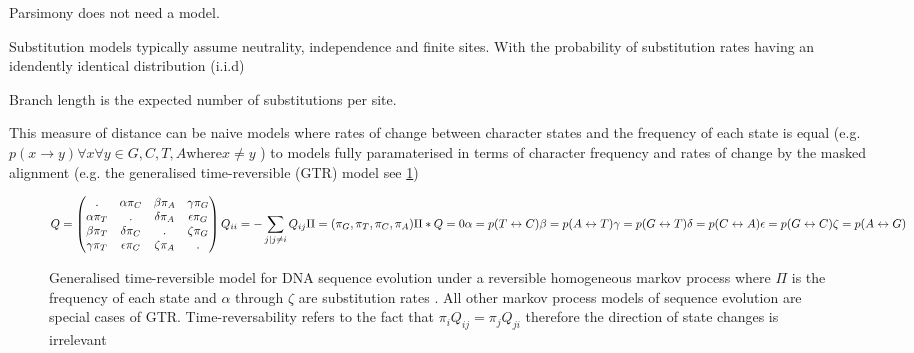 Parsimony does not need a model.




Substitution models typically assume neutrality, independence and finite sites.
With the probability of substitution rates having an idendently identical distribution (i.i.d) \citep{Hasegawa1985}




Branch length is the expected number of substitutions per site.

This measure of distance can be naive models where rates of change between character
states and the frequency of each state is equal (e.g. \(p(x \rightarrow y) \forall x \forall y \in {G,C,T,A} \text{where} x\neq y\)
\citep{jukes1969evolution}) to models fully paramaterised in terms of character frequency and rates of change by the masked alignment 
(e.g. the generalised time-reversible (GTR) model \citep{Tavare1986} see \ref{eq:gtr})

\begin{figure}
    \[Q=\begin{pmatrix}
        . & \alpha\pi_{C}  & \beta\pi_{A} & \gamma\pi_{G}\\ 
        \alpha\pi_{T} & . & \delta\pi_{A} & \epsilon\pi_{G}\\ 
        \beta\pi_{T} & \delta\pi_{C} & . & \zeta\pi_{G}\\ 
        \gamma\pi_{T} & \epsilon\pi_{C} & \zeta\pi_{A} & .
    \end{pmatrix}\\
    Q_{ii} = -\sum_{{j | j \neq i}} Q_{ij}\\
    \Pi = (\pi_{G}, \pi_{T}, \pi_{C}, \pi_{A})\\
    \Pi * Q = 0 \\
    \alpha = p(T \leftrightarrow C)\\
    \beta = p(A \leftrightarrow T)\\
    \gamma = p(G \leftrightarrow T)\\
    \delta = p(C \leftrightarrow A)\\
    \epsilon = p(G \leftrightarrow C)\\
        \zeta = p(A \leftrightarrow G)\]
        \caption{Generalised time-reversible model for DNA sequence evolution under a reversible homogeneous markov process where \(\Pi\) is the 
        frequency of each state and \(\alpha\) through \(\zeta\) are substitution rates \citep{Tavare1986,Yang1994}.  All other markov process models
    of sequence evolution are special cases of GTR.   Time-reversability refers to the fact that \(\pi_{i}Q_{ij} = \pi_{j}Q_{ji}\) therefore
   the direction of state changes is irrelevant}
        \label{eq:gtr}
\end{figure}

